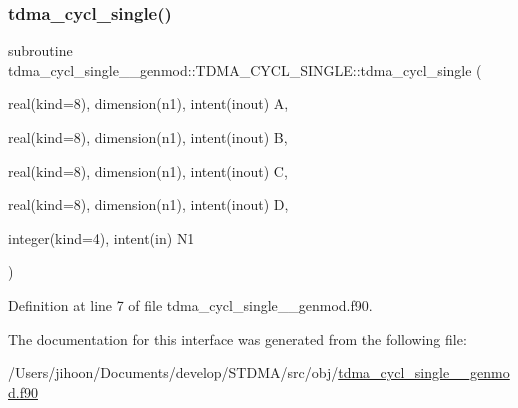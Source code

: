 \subsubsection{\texorpdfstring{tdma\_cycl\_single()}{tdma\_cycl\_single()}}
{\footnotesize\ttfamily subroutine tdma\+\_\+cycl\+\_\+single\+\_\+\+\_\+genmod\+::\+T\+D\+M\+A\+\_\+\+C\+Y\+C\+L\+\_\+\+S\+I\+N\+G\+L\+E\+::tdma\+\_\+cycl\+\_\+single (\begin{DoxyParamCaption}\item[{real(kind=8), dimension(n1), intent(inout)}]{A,  }\item[{real(kind=8), dimension(n1), intent(inout)}]{B,  }\item[{real(kind=8), dimension(n1), intent(inout)}]{C,  }\item[{real(kind=8), dimension(n1), intent(inout)}]{D,  }\item[{integer(kind=4), intent(in)}]{N1 }\end{DoxyParamCaption})}



Definition at line 7 of file tdma\+\_\+cycl\+\_\+single\+\_\+\+\_\+genmod.\+f90.



The documentation for this interface was generated from the following file\+:\begin{DoxyCompactItemize}
\item 
/\+Users/jihoon/\+Documents/develop/\+S\+T\+D\+M\+A/src/obj/\mbox{\hyperlink{tdma__cycl__single____genmod_8f90}{tdma\+\_\+cycl\+\_\+single\+\_\+\+\_\+genmod.\+f90}}\end{DoxyCompactItemize}
